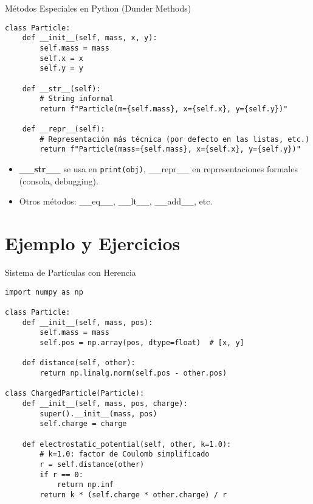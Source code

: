 \documentclass[10pt]{beamer}
\begin{document}
\begin{frame}[fragile]{Métodos Especiales en Python (Dunder Methods)}
\begin{verbatim}
class Particle:
    def __init__(self, mass, x, y):
        self.mass = mass
        self.x = x
        self.y = y

    def __str__(self):
        # String informal
        return f"Particle(m={self.mass}, x={self.x}, y={self.y})"

    def __repr__(self):
        # Representación más técnica (por defecto en las listas, etc.)
        return f"Particle(mass={self.mass}, x={self.x}, y={self.y})"
\end{verbatim}
\begin{itemize}
  \item \textbf{\_\_str\_\_} se usa en \texttt{print(obj)}, \_\_repr\_\_ en representaciones formales (consola, debugging).
  \item Otros métodos: \_\_eq\_\_, \_\_lt\_\_, \_\_add\_\_, etc.
\end{itemize}
\end{frame}

\section{Ejemplo y Ejercicios}

\begin{frame}[fragile]{Sistema de Partículas con Herencia}
\begin{verbatim}
import numpy as np

class Particle:
    def __init__(self, mass, pos):
        self.mass = mass
        self.pos = np.array(pos, dtype=float)  # [x, y]

    def distance(self, other):
        return np.linalg.norm(self.pos - other.pos)

class ChargedParticle(Particle):
    def __init__(self, mass, pos, charge):
        super().__init__(mass, pos)
        self.charge = charge

    def electrostatic_potential(self, other, k=1.0):
        # k=1.0: factor de Coulomb simplificado
        r = self.distance(other)
        if r == 0:
            return np.inf
        return k * (self.charge * other.charge) / r
\end{verbatim}
\end{frame}
\end{document}
